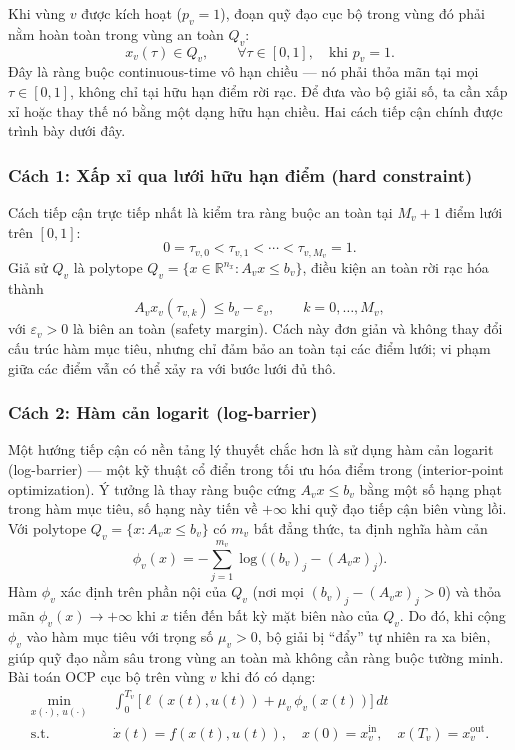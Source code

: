 Khi vùng $v$ được kích hoạt ($p_v=1$), đoạn quỹ đạo cục bộ trong vùng đó phải nằm hoàn toàn trong vùng an toàn $Q_v$:
\begin{equation}
x_v(\tau)\in Q_v,
\qquad \forall \tau\in[0,1],
\quad \text{khi } p_v=1.
\label{eq:region_constraint_ocp}
\end{equation}
Đây là ràng buộc continuous-time vô hạn chiều — nó phải thỏa mãn tại mọi $\tau\in[0,1]$, không chỉ tại hữu hạn điểm rời rạc. Để đưa vào bộ giải số, ta cần xấp xỉ hoặc thay thế nó bằng một dạng hữu hạn chiều. Hai cách tiếp cận chính được trình bày dưới đây.

\subsubsection*{Cách 1: Xấp xỉ qua lưới hữu hạn điểm (hard constraint)}

Cách tiếp cận trực tiếp nhất là kiểm tra ràng buộc an toàn tại $M_v+1$ điểm lưới trên $[0,1]$:
\[
0=\tau_{v,0}<\tau_{v,1}<\cdots<\tau_{v,M_v}=1.
\]
Giả sử $Q_v$ là polytope $Q_v=\{x\in\mathbb{R}^{n_x}:A_vx\le b_v\}$, điều kiện an toàn rời rạc hóa thành
\[
A_v x_v(\tau_{v,k})\le b_v-\varepsilon_v,
\qquad k=0,\dots,M_v,
\]
với $\varepsilon_v>0$ là biên an toàn (safety margin). Cách này đơn giản và không thay đổi cấu trúc hàm mục tiêu, nhưng chỉ đảm bảo an toàn tại các điểm lưới; vi phạm giữa các điểm vẫn có thể xảy ra với bước lưới đủ thô.

\subsubsection*{Cách 2: Hàm cản logarit (log-barrier)}
\label{subsubsec:log_barrier}

Một hướng tiếp cận có nền tảng lý thuyết chắc hơn là sử dụng hàm cản logarit (log-barrier) — một kỹ thuật cổ điển trong tối ưu hóa điểm trong (interior-point optimization). Ý tưởng là thay ràng buộc cứng $A_v x \le b_v$ bằng một số hạng phạt trong hàm mục tiêu, số hạng này tiến về $+\infty$ khi quỹ đạo tiếp cận biên vùng lồi. Với polytope $Q_v = \{x : A_v x \le b_v\}$ có $m_v$ bất đẳng thức, ta định nghĩa hàm cản
\begin{equation}
\phi_v(x)
= -\sum_{j=1}^{m_v}\log\bigl((b_v)_j-(A_v x)_j\bigr).
\label{eq:log_barrier_def}
\end{equation}
Hàm $\phi_v$ xác định trên phần nội của $Q_v$ (nơi mọi $(b_v)_j-(A_vx)_j>0$) và thỏa mãn $\phi_v(x)\to+\infty$ khi $x$ tiến đến bất kỳ mặt biên nào của $Q_v$. Do đó, khi cộng $\phi_v$ vào hàm mục tiêu với trọng số $\mu_v>0$, bộ giải bị ``đẩy'' tự nhiên ra xa biên, giúp quỹ đạo nằm sâu trong vùng an toàn mà không cần ràng buộc tường minh. Bài toán OCP cục bộ trên vùng $v$ khi đó có dạng:
\[
\begin{aligned}
    \min_{x(\cdot),\,u(\cdot)} \quad
    & \int_{0}^{T_v}\!\bigl[\ell(x(t),u(t)) + \mu_v\,\phi_v(x(t))\bigr]\,dt \\
    \text{s.t.} \quad
    & \dot{x}(t) = f(x(t),u(t)),\quad
      x(0) = x_v^{\mathrm{in}},\quad x(T_v) = x_v^{\mathrm{out}}.
\end{aligned}
\]

